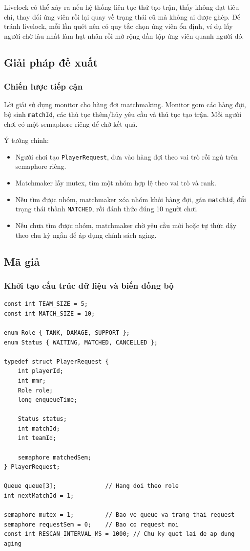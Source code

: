 Livelock có thể xảy ra nếu hệ thống liên tục thử tạo trận, thấy không đạt tiêu
chí, thay đổi ứng viên rồi lại quay về trạng thái cũ mà không ai được ghép.
Để tránh livelock, mỗi lần quét nên có quy tắc chọn ứng viên ổn định, ví dụ lấy
người chờ lâu nhất làm hạt nhân rồi mở rộng dần tập ứng viên quanh người đó.

\subsection{Giải pháp đề xuất}

\subsubsection*{Chiến lược tiếp cận}

Lời giải sử dụng monitor cho hàng đợi matchmaking. Monitor gom các hàng đợi,
bộ sinh \texttt{matchId}, các thủ tục thêm/hủy yêu cầu và thủ tục tạo trận.
Mỗi người chơi có một semaphore riêng để chờ kết quả.

Ý tưởng chính:

\begin{itemize}
    \item Người chơi tạo \texttt{PlayerRequest}, đưa vào hàng đợi theo vai trò
    rồi ngủ trên semaphore riêng.
    \item Matchmaker lấy mutex, tìm một nhóm hợp lệ theo vai trò và rank.
    \item Nếu tìm được nhóm, matchmaker xóa nhóm khỏi hàng đợi, gán
    \texttt{matchId}, đổi trạng thái thành \texttt{MATCHED}, rồi đánh thức đúng
    10 người chơi.
    \item Nếu chưa tìm được nhóm, matchmaker chờ yêu cầu mới hoặc tự thức dậy
    theo chu kỳ ngắn để áp dụng chính sách aging.
\end{itemize}

\subsection{Mã giả}

\subsubsection*{Khởi tạo cấu trúc dữ liệu và biến đồng bộ}

\begin{lstlisting}
const int TEAM_SIZE = 5;
const int MATCH_SIZE = 10;

enum Role { TANK, DAMAGE, SUPPORT };
enum Status { WAITING, MATCHED, CANCELLED };

typedef struct PlayerRequest {
    int playerId;
    int mmr;
    Role role;
    long enqueueTime;

    Status status;
    int matchId;
    int teamId;

    semaphore matchedSem;
} PlayerRequest;

Queue queue[3];              // Hang doi theo role
int nextMatchId = 1;

semaphore mutex = 1;         // Bao ve queue va trang thai request
semaphore requestSem = 0;    // Bao co request moi
const int RESCAN_INTERVAL_MS = 1000; // Chu ky quet lai de ap dung aging
\end{lstlisting}

